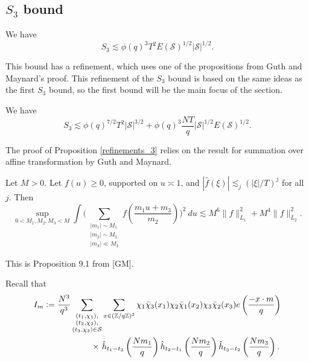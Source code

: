 
\subsection{$S_3$ bound}
\begin{proposition}\label{s_3bound}
    We have \[
    S_3 \lesssim \phi(q)^3 T^2 E(\mathcal{S})^{1/2} |\mathcal{S}|^{1/2}.
    \]
\end{proposition}
This bound has a refinement, which uses one of the propositions from Guth and Maynard's proof. This refinement of the $S_3$ bound is based on the same ideas as the first $S_3$ bound, so the first bound will be the main focus of the section.
\begin{proposition}[Refinement of $S_3$]
    \label{refinements_3}
    We have \[
    S_3\lesssim \phi(q)^{7/2}T^2|\mathcal{S}|^{3/2}+\phi(q)^{3}\frac{NT}{q}|\mathcal{S}|^{1/2}E(\mathcal{S})^{1/2}.
     \]
\end{proposition}
The proof of Proposition \ref{refinements_3} relies on the result for summation over affine transformation by Guth and Maynard.
\begin{lemma}\label{affinetrans}
    Let $M>0$. Let $f(u)\geq 0$, supported on $u\asymp 1$, and $|\hat{f}(\xi)|\lesssim_j (|\xi|/T)^j$ for all $j$. Then \[
        \sup_{0<M_1,M_2,M_3<M} \int\Bigg( \sum_{\substack{|m_1|\sim M_1\\|m_2|\sim M_2 \\ |m_3|\ll M_3}} f\left(\frac{m_1 u+m_3}{m_2}\right)\Bigg)^2 \ du \lesssim M^6 \|f\|_{L_1}^2+M^4\|f\|_{L_2}^2.
    \] 
\end{lemma}
This is Proposition 9.1 from [GM].

Recall that \begin{align*}
	I_m\defeq\frac{N^3}{q^3}\sum_{\substack{(t_1,\chi_1),\\(t_2,\chi_2),\\(t_3,\chi_3)\in\mathcal{S}}} &\sum_{x\in (\mathbb{Z}/q\mathbb{Z})^3}\chi_1\bar{\chi}_3(x_1)\chi_2\bar{\chi}_1(x_2)\chi_3\bar{\chi}_2(x_3) e\left(\frac{-x\cdot m}{q}\right)\\
	\times \ &\hat{h}_{t_1-t_3}\left(\frac{Nm_1}{q}\right)\hat{h}_{t_2-t_1}\left(\frac{Nm_2}{q}\right)\hat{h}_{t_3-t_2}\left(\frac{Nm_3}{q}\right).
\end{align*}


